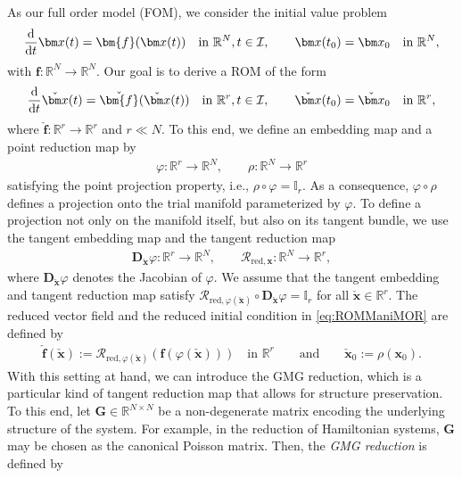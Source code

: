 \documentclass{article}
\newcommand{\bmf}{\bm{f}}
\newcommand{\bmD}{\bm{D}}
\newcommand{\R}{\mathbb{R}}
\newcommand{\statex}{{\bm x}}
\newcommand{\stateRed}{\check{\bm x}}
\newcommand{\ddt}{\frac{\rm d}{{\rm d} t}}
\newcommand{\FOMsize}{N}
\newcommand{\ROMsize}{r}
\newcommand{\approxfunc}{\varphi}
\newcommand{\GMG}{\textsf{GMG}\xspace}
\newcommand{\FOM}{\textsf{FOM}\xspace}
\newcommand{\ROM}{\textsf{ROM}\xspace}
\renewcommand{\emph}[1]{\textit{#1}}
\begin{document}
	As our full order model (\FOM), we consider the initial value problem 
	\begin{align*}
		\ddt \statex(t) = \bmf (\statex(t)) \quad \text{in }  \R^{\FOMsize}, t \in \mathcal{I}, \qquad \statex(t_0) = \statex_0 \quad \text{in } \R^{\FOMsize}, 
	\end{align*}
	with $\bmf : \R^{\FOMsize} \rightarrow \R^{\FOMsize}$. Our goal is to derive a \ROM of the form 
	\begin{align}
		\label{eq:ROMManiMOR}
		\ddt \stateRed(t) = \check{\bmf} (\stateRed(t)) \quad \text{in }  \R^{\ROMsize}, t \in \mathcal{I}, \qquad \stateRed(t_0) = \stateRed_0 \quad \text{in } \R^{\ROMsize}, 
	\end{align}
	where $\check{\bmf} : \R^{\ROMsize} \rightarrow \R^{\ROMsize}$ and $\ROMsize \ll \FOMsize$. To this end, we define an embedding map and a point reduction map by 
	\begin{align*}
		\approxfunc :  \R^{\ROMsize} \rightarrow  \R^{\FOMsize}, \qquad  \rho :  \R^{\FOMsize} \rightarrow  \R^{\ROMsize}
	\end{align*} 
	satisfying the point projection property, i.e., $\rho \circ \approxfunc = \mathbb{I}_{\ROMsize}$. As a consequence, $\approxfunc \circ \rho$ defines a projection onto the trial manifold parameterized by $\approxfunc$. 
	To define a projection not only on the manifold itself, but also on its tangent bundle, we use the tangent embedding map and the tangent reduction map
	\begin{align*}
		\bmD_{\stateRed}\approxfunc :  \R^{\ROMsize} \rightarrow  \R^{\FOMsize}, \qquad  \mathcal{R}_{\text{red},\statex} :  \R^{\FOMsize} \rightarrow  \R^{\ROMsize},
	\end{align*}
	where $\bmD_{\stateRed}\approxfunc$ denotes the Jacobian of $\approxfunc$. We assume that the tangent embedding and tangent reduction map satisfy $\mathcal{R}_{\text{red}, \approxfunc(\stateRed)}  \circ \bmD_{\stateRed}\approxfunc= \mathbb{I}_{\ROMsize} $ for all $\stateRed \in \R^{\ROMsize}$. The reduced vector field and the reduced initial condition in \eqref{eq:ROMManiMOR} are defined by
	\begin{align*}
		\check{\bmf}(\stateRed) :=	 \mathcal{R}_{\text{red},\approxfunc(\stateRed)} \left(\bmf(\approxfunc(\stateRed))\right) \quad  \text{in } \R^{\ROMsize}  \qquad\text{and}\qquad \stateRed_0 := \rho(\statex_0).
	\end{align*} 
	With this setting at hand, we can introduce the \GMG reduction, which is a particular kind of tangent reduction map that allows for structure preservation. To this end, let $\bm{G} \in \R^{\FOMsize \times \FOMsize}$ be a non-degenerate matrix encoding the underlying structure of the system. For example, in the reduction of Hamiltonian systems, $\bm{G}$ may be chosen as the canonical Poisson matrix. Then, the \emph{\GMG reduction} is defined by
\end{document}
